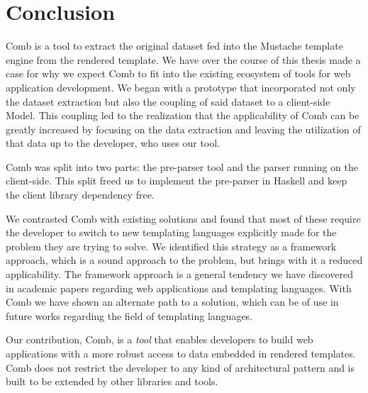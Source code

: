 \documentclass[thesis.tex]{subfiles}
\begin{document}
\chapter{Conclusion}
\label{chap:conclusion}
Comb is a tool to extract the original dataset fed into the Mustache template
engine from the rendered template. We have over the course of this thesis made a
case for why we expect Comb to fit into the existing ecosystem of tools for web
application development. We began with a prototype that incorporated not only
the dataset extraction but also the coupling of said dataset to a client-side
Model.
This coupling led to the realization that the applicability of Comb can be
greatly increased by focusing on the data extraction and leaving the utilization
of that data up to the developer, who uses our tool.

Comb was split into two parts: the pre-parser tool and the parser running on
the client-side. This split freed us to implement the pre-parser in Haskell
and keep the client library dependency free.

We contrasted Comb with existing solutions and found that most of these require
the developer to switch to new templating languages explicitly made for the
problem they are trying to solve. We identified this strategy as a framework
approach, which is a sound approach to the problem, but brings with it a reduced
applicability. The framework approach is a general tendency we have discovered
in academic papers regarding web applications and templating languages. With
Comb we have shown an alternate path to a solution, which can be of use in
future works regarding the field of templating languages.

Our contribution, Comb, is a \emph{tool} that enables developers to
build web applications with a more robust access to data embedded in rendered
templates. Comb does not restrict the developer to any kind of architectural
pattern and is built to be extended by other libraries and tools.
\end{document}

